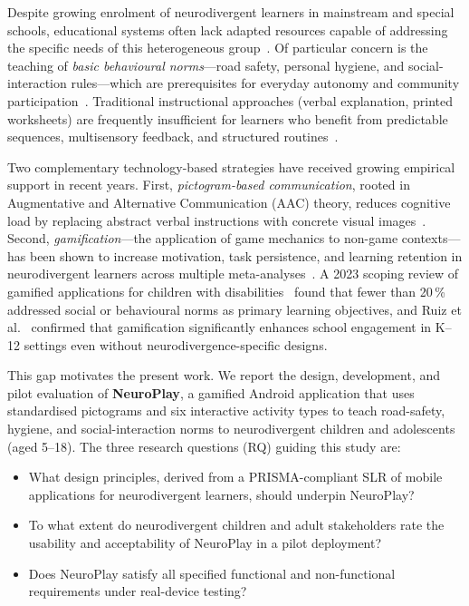 \documentclass[preprint,12pt]{elsarticle}
\begin{document}
        Despite growing enrolment of neurodivergent learners in mainstream and special schools, educational systems often lack adapted resources capable of addressing the specific needs of this heterogeneous group~\cite{Chinchay2024}.
        Of particular concern is the teaching of \emph{basic behavioural norms}---road safety, personal hygiene, and social-interaction rules---which are prerequisites for everyday autonomy and community participation~\cite{Johnston2016}. Traditional instructional approaches (verbal explanation, printed worksheets) are frequently insufficient for learners who benefit from predictable sequences, multisensory feedback, and structured routines~\cite{Ntalindwa2021}.
        
        Two complementary technology-based strategies have received growing empirical support in recent years. First, \emph{pictogram-based communication}, rooted in Augmentative and Alternative Communication (AAC) theory, reduces cognitive load by replacing abstract verbal instructions with concrete visual images~\cite{Perez-Fuster2025,Johnston2016}. Second, \emph{gamification}---the application of game mechanics to non-game contexts---has been shown to increase motivation, task persistence, and learning retention in neurodivergent learners across multiple meta-analyses~\cite{Sailer2020,Zeng2024,Lin2025,Ribeiro2024}. A 2023 scoping review of gamified applications for children with disabilities~\cite{Mahmoudi2023} found that fewer than 20\,\% addressed social or behavioural norms as primary learning objectives, and Ruiz et al.~\cite{Ruiz2024} confirmed that gamification significantly enhances school engagement in K--12 settings even without neurodivergence-specific designs.
        
        This gap motivates the present work. We report the design, development, and pilot evaluation of \textbf{NeuroPlay}, a gamified Android application that uses standardised pictograms and six interactive activity types to teach road-safety, hygiene, and social-interaction norms to neurodivergent children and adolescents (aged 5--18). The three research questions (RQ) guiding this study are:
        
        \begin{itemize}
            \item[\textbf{RQ1}] What design principles, derived from a PRISMA-compliant SLR of mobile applications for neurodivergent learners, should underpin NeuroPlay?
            \item[\textbf{RQ2}] To what extent do neurodivergent children and adult stakeholders rate the usability and acceptability of NeuroPlay in a pilot deployment?
            \item[\textbf{RQ3}] Does NeuroPlay satisfy all specified functional and non-functional requirements under real-device testing?
        \end{itemize}
        
\end{document}
